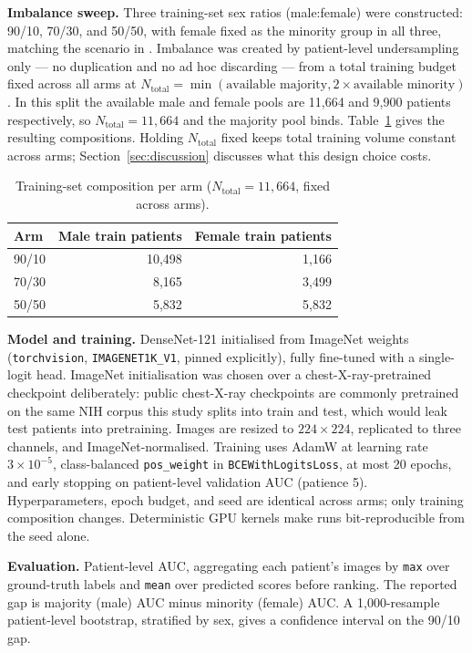 \documentclass[11pt]{article}
\begin{document}
\textbf{Imbalance sweep.} Three training-set sex ratios (male:female) were constructed: 90/10, 70/30, and 50/50, with female fixed as the minority group in all three, matching the scenario in \cite{larrazabal2020}. Imbalance was created by patient-level undersampling only --- no duplication and no ad hoc discarding --- from a total training budget fixed across all arms at $N_{\text{total}} = \min(\text{available majority}, 2\times\text{available minority})$. In this split the available male and female pools are 11,664 and 9,900 patients respectively, so $N_{\text{total}} = 11{,}664$ and the majority pool binds. Table~\ref{tab:composition} gives the resulting compositions. Holding $N_{\text{total}}$ fixed keeps total training volume constant across arms; Section~\ref{sec:discussion} discusses what this design choice costs.

\begin{table}[H]
\centering
\begin{tabular}{lrr}
\toprule
Arm & Male train patients & Female train patients \\
\midrule
90/10 & 10{,}498 & 1{,}166 \\
70/30 & 8{,}165 & 3{,}499 \\
50/50 & 5{,}832 & 5{,}832 \\
\bottomrule
\end{tabular}
\caption{Training-set composition per arm ($N_{\text{total}}=11{,}664$, fixed across arms).}
\label{tab:composition}
\end{table}

\textbf{Model and training.} DenseNet-121 \cite{huang2017} initialised from ImageNet \cite{deng2009} weights (\texttt{torchvision}, \texttt{IMAGENET1K\_V1}, pinned explicitly), fully fine-tuned with a single-logit head. ImageNet initialisation was chosen over a chest-X-ray-pretrained checkpoint deliberately: public chest-X-ray checkpoints are commonly pretrained on the same NIH corpus this study splits into train and test, which would leak test patients into pretraining. Images are resized to $224\times224$, replicated to three channels, and ImageNet-normalised. Training uses AdamW at learning rate $3\times10^{-5}$, class-balanced \texttt{pos\_weight} in \texttt{BCEWithLogitsLoss}, at most 20 epochs, and early stopping on patient-level validation AUC (patience 5). Hyperparameters, epoch budget, and seed are identical across arms; only training composition changes. Deterministic GPU kernels make runs bit-reproducible from the seed alone.

\textbf{Evaluation.} Patient-level AUC, aggregating each patient's images by \texttt{max} over ground-truth labels and \texttt{mean} over predicted scores before ranking. The reported gap is majority (male) AUC minus minority (female) AUC. A 1,000-resample patient-level bootstrap, stratified by sex, gives a confidence interval on the 90/10 gap.
\end{document}
